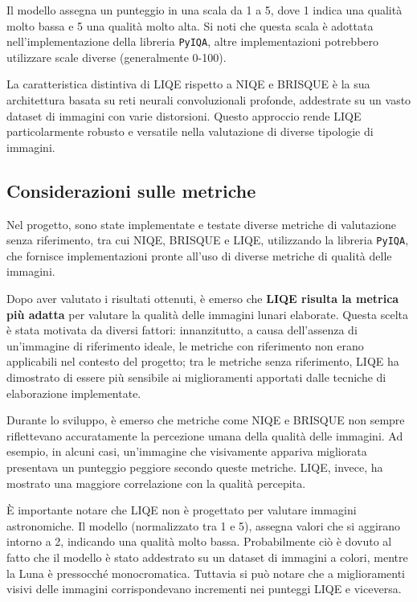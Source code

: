 Il modello assegna un punteggio in una scala da 1 a 5, dove 1 indica una qualità molto bassa e 5 una qualità molto alta. Si noti che questa scala è adottata nell'implementazione della libreria \texttt{PyIQA}, altre implementazioni potrebbero utilizzare scale diverse (generalmente 0-100).

La caratteristica distintiva di LIQE rispetto a NIQE e BRISQUE è la sua architettura basata su reti neurali convoluzionali profonde, addestrate su un vasto dataset di immagini con varie distorsioni. Questo approccio rende LIQE particolarmente robusto e versatile nella valutazione di diverse tipologie di immagini.

\subsection{Considerazioni sulle metriche} \label{subsec:why_liqe}

Nel progetto, sono state implementate e testate diverse metriche di valutazione senza riferimento, tra cui NIQE, BRISQUE e LIQE, utilizzando la libreria \texttt{PyIQA}, che fornisce implementazioni pronte all'uso di diverse metriche di qualità delle immagini.

Dopo aver valutato i risultati ottenuti, è emerso che \textbf{LIQE risulta la metrica più adatta} per valutare la qualità delle immagini lunari elaborate. Questa scelta è stata motivata da diversi fattori: innanzitutto, a causa dell'assenza di un'immagine di riferimento ideale, le metriche con riferimento non erano applicabili nel contesto del progetto; tra le metriche senza riferimento, LIQE ha dimostrato di essere più sensibile ai miglioramenti apportati dalle tecniche di elaborazione implementate.

Durante lo sviluppo, è emerso che metriche come NIQE e BRISQUE non sempre riflettevano accuratamente la percezione umana della qualità delle immagini. Ad esempio, in alcuni casi, un'immagine che visivamente appariva migliorata presentava un punteggio peggiore secondo queste metriche. LIQE, invece, ha mostrato una maggiore correlazione con la qualità percepita.

È importante notare che LIQE non è progettato per valutare immagini astronomiche. Il modello (normalizzato tra 1 e 5), assegna valori che si aggirano intorno a 2, indicando una qualità molto bassa. Probabilmente ciò è dovuto al fatto che il modello è stato addestrato su un dataset di immagini a colori, mentre la Luna è pressocché monocromatica. Tuttavia si può notare che a miglioramenti visivi delle immagini corrispondevano incrementi nei punteggi LIQE e viceversa.

